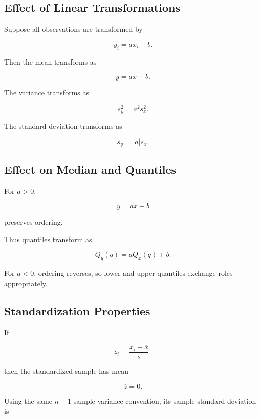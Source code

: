 \subsection{Effect of Linear Transformations}
\label{subsec:linear-transformations-descriptive}

Suppose all observations are transformed by

\[
\boxed{
y_i=ax_i+b.
}
\]

Then the mean transforms as

\[
\boxed{
\overline{y}
=
a\overline{x}+b.
}
\]

The variance transforms as

\[
\boxed{
s_y^2
=
a^2s_x^2.
}
\]

The standard deviation transforms as

\[
\boxed{
s_y
=
|a|s_x.
}
\]

\subsection{Effect on Median and Quantiles}
\label{subsec:transform-median-quantiles}

For \(a>0\),

\[
y=ax+b
\]

preserves ordering.

Thus quantiles transform as

\[
\boxed{
Q_y(q)
=
aQ_x(q)+b.
}
\]

For \(a<0\), ordering reverses, so lower and upper quantiles exchange
roles appropriately.

\subsection{Standardization Properties}
\label{subsec:standardization-properties}

If

\[
z_i
=
\frac{x_i-\overline{x}}{s},
\]

then the standardized sample has mean

\[
\boxed{
\overline{z}=0.
}
\]

Using the same \(n-1\) sample-variance convention, its sample standard
deviation is

